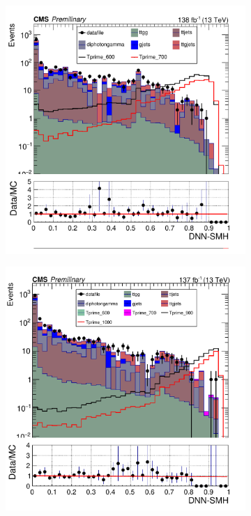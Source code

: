 \begin{figure}[H]
     \centering
     \begin{subfigure}[b]{0.3\textwidth}
         \centering
         \includegraphics[width=\textwidth]{figure_4/Stacked_plot_DNN_600-700_with_diphoton_cuts_Scaled_inputs.pdf}
         \label{fig:y equals x}
     \end{subfigure}
     \hfill
     \begin{subfigure}[b]{0.3\textwidth}
         \centering
         \includegraphics[width=\textwidth]{figure_4/Stacked_plot_DNN_800-1000_with_diphoton_cuts_scaled_inputs.pdf}

\end{subfigure}
\end{figure}
